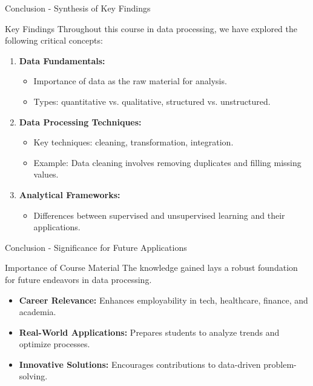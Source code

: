 \documentclass[aspectratio=169]{beamer}
\begin{document}
\begin{frame}[fragile]{Conclusion - Synthesis of Key Findings}
  \begin{block}{Key Findings}
    Throughout this course in data processing, we have explored the following critical concepts:
  \end{block}
  \begin{enumerate}
    \item \textbf{Data Fundamentals:}
    \begin{itemize}
      \item Importance of data as the raw material for analysis.
      \item Types: quantitative vs. qualitative, structured vs. unstructured.
    \end{itemize}
    
    \item \textbf{Data Processing Techniques:}
    \begin{itemize}
      \item Key techniques: cleaning, transformation, integration.
      \item Example: Data cleaning involves removing duplicates and filling missing values.
    \end{itemize}

    \item \textbf{Analytical Frameworks:}
    \begin{itemize}
      \item Differences between supervised and unsupervised learning and their applications.
    \end{itemize}
  \end{enumerate}
\end{frame}

\begin{frame}[fragile]{Conclusion - Significance for Future Applications}
  \begin{block}{Importance of Course Material}
    The knowledge gained lays a robust foundation for future endeavors in data processing.
  \end{block}
  \begin{itemize}
    \item \textbf{Career Relevance:} Enhances employability in tech, healthcare, finance, and academia.
    \item \textbf{Real-World Applications:} Prepares students to analyze trends and optimize processes.
    \item \textbf{Innovative Solutions:} Encourages contributions to data-driven problem-solving.
  \end{itemize}
\end{frame}
\end{document}
